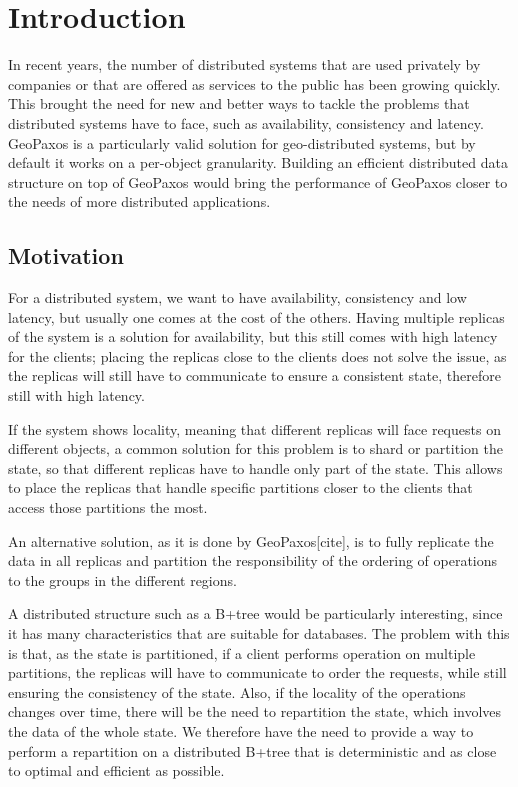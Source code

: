 \chapter{Introduction}\label{sec:introduction}
In recent years, the number of distributed systems that are used privately by companies or that are offered as services to the public has been growing quickly. This brought the need for new and better ways to tackle the problems that distributed systems have to face, such as availability, consistency and latency. GeoPaxos is a particularly valid solution for geo-distributed systems, but by default it works on a per-object granularity. Building an efficient distributed data structure on top of GeoPaxos would bring the performance of GeoPaxos closer to the needs of more distributed applications.

\section{Motivation}\label{sec:motivation}
For a distributed system, we want to have availability, consistency and low latency, but usually one comes at the cost of the others. Having multiple replicas of the system is a solution for availability, but this still comes with high latency for the clients; placing the replicas close to the clients does not solve the issue, as the replicas will still have to communicate to ensure a consistent state, therefore still with high latency.

If the system shows locality, meaning that different replicas will face requests on different objects, a common solution for this problem is to shard or partition the state, so that different replicas have to handle only part of the state. This allows to place the replicas that handle specific partitions closer to the clients that access those partitions the most.

An alternative solution, as it is done by GeoPaxos[cite], is to fully replicate the data in all replicas and partition the responsibility of the ordering of operations to the groups in the different regions.

A distributed structure such as a B+tree would be particularly interesting, since it has many characteristics that are suitable for databases. The problem with this is that, as the state is partitioned, if a client performs operation on multiple partitions, the replicas will have to communicate to order the requests, while still ensuring the consistency of the state. Also, if the locality of the operations changes over time, there will be the need to repartition the state, which involves the data of the whole state. We therefore have the need to provide a way to perform a repartition on a distributed B+tree that is deterministic and as close to optimal and efficient as possible.

